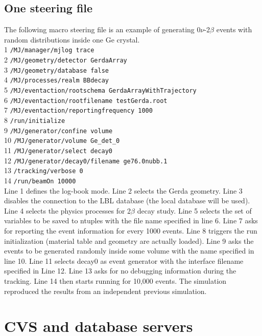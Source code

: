 \documentclass[a4paper,12pt,twoside]{article}
\begin{document}
\subsection{One steering file}

The following macro steering file is an example of generating
0$\nu$-2$\beta$ events with random distributions
inside one Ge crystal. \\
1 {\tt/MJ/manager/mjlog trace} \\
2 {\tt/MJ/geometry/detector GerdaArray} \\
3 {\tt/MJ/geometry/database false} \\
4 {\tt/MJ/processes/realm BBdecay} \\
5 {\tt/MJ/eventaction/rootschema GerdaArrayWithTrajectory} \\
6 {\tt/MJ/eventaction/rootfilename testGerda.root} \\
7 {\tt/MJ/eventaction/reportingfrequency 1000} \\
8 {\tt/run/initialize} \\
9 {\tt/MJ/generator/confine volume} \\
10 {\tt/MJ/generator/volume Ge\_det\_0} \\
11 {\tt/MJ/generator/select decay0} \\
12 {\tt/MJ/generator/decay0/filename ge76.0nubb.1} \\
13 {\tt/tracking/verbose 0} \\
14 {\tt/run/beamOn 10000} \\

Line 1 defines the log-book mode. Line 2 selects the Gerda geometry.
Line 3 disables the connection to the LBL database
(the local database will be used). 
Line 4 selects the physics processes for 2$\beta$ decay study.
Line 5 selects the set of variables to be saved to ntuples with
the file name specified in line 6.
Line 7 asks for reporting the event information for every 1000 events.
Line 8 triggers the run initialization (material table and 
geometry are actually loaded). 
Line 9 asks the events to be generated randomly
inside some volume with the name specified in line 10.
Line 11 selects decay0 as event generator with the interface filename
specified in Line 12. Line 13 asks for no debugging information during 
the tracking. Line 14 then starts running for 10,000 events. 
%
The simulation reproduced the results from
an independent previous simulation.



\section{CVS and database servers}
\label{sec:cvs-and-database-servers}
\end{document}
